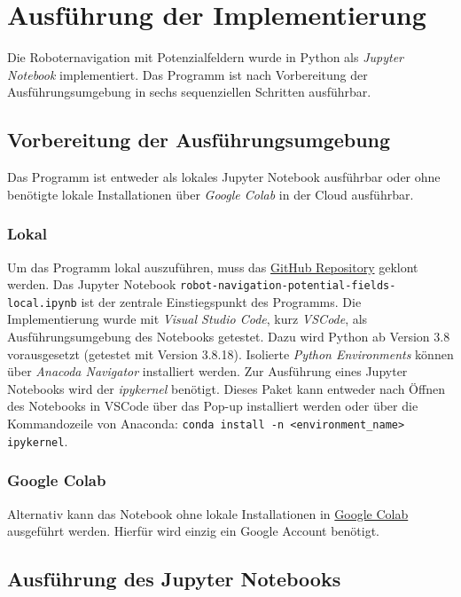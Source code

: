 \chapter{Ausführung der Implementierung}

Die Roboternavigation mit Potenzialfeldern wurde in Python als \textit{Jupyter Notebook} implementiert.
Das Programm ist nach Vorbereitung der Ausführungsumgebung in sechs sequenziellen Schritten ausführbar.

\section{Vorbereitung der Ausführungsumgebung}

Das Programm ist entweder als lokales Jupyter Notebook ausführbar oder ohne benötigte lokale Installationen über \textit{Google Colab} in der Cloud ausführbar.

\subsection*{Lokal}
Um das Programm lokal auszuführen, muss das \href{https://github.com/ca-schue/potential-field.git}{GitHub Repository} geklont werden.
Das Jupyter Notebook \texttt{robot-navigation-potential-fields-local.ipynb} ist der zentrale Einstiegspunkt des Programms.
Die Implementierung wurde mit \textit{Visual Studio Code}, kurz \textit{VSCode}, als Ausführungsumgebung des Notebooks getestet.
Dazu wird Python ab Version 3.8 vorausgesetzt (getestet mit Version 3.8.18).
Isolierte \textit{Python Environments} können über \textit{Anacoda Navigator} installiert werden.
Zur Ausführung eines Jupyter Notebooks wird der \textit{ipykernel} benötigt. Dieses Paket kann entweder nach Öffnen des Notebooks in VSCode über das Pop-up installiert werden oder über die Kommandozeile von Anaconda: \texttt{conda install -n <environment\_name> ipykernel}.

\subsection*{Google Colab}
Alternativ kann das Notebook ohne lokale Installationen in \href{https://colab.research.google.com/gist/ca-schue/73cff6faf02b6d75d84573625fd89bea/robot-navigation-with-potential-fields.ipynb}{Google Colab} ausgeführt werden. Hierfür wird einzig ein Google Account benötigt.


\section{Ausführung des Jupyter Notebooks}

